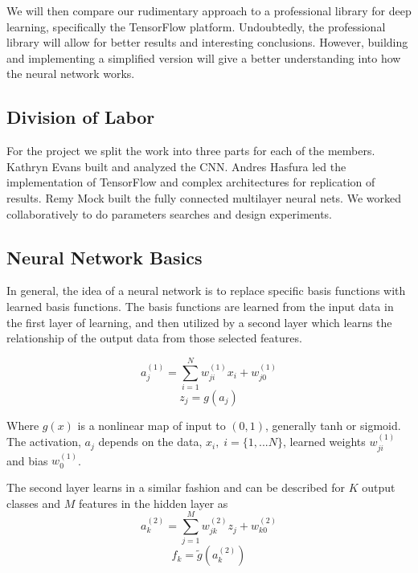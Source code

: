 \documentclass[12pt, twocolumn]{article}
\begin{document}
 We will then compare our rudimentary approach to a professional library for deep learning, specifically the TensorFlow platform. Undoubtedly, the professional library will allow for better results and interesting conclusions. However, building and implementing a simplified version will give a better understanding into how the neural network works. 

\subsection{Division of Labor}
	
 
 For the project we split the work into three parts for each of the members. Kathryn Evans built and analyzed the CNN. Andres Hasfura led the implementation of TensorFlow and complex architectures for replication of results. Remy Mock built the fully connected multilayer neural nets. We worked collaboratively to do parameters searches and design experiments. 

\subsection{Neural Network Basics}

In general, the idea of a neural network is to replace specific basis functions with learned basis functions. The basis functions are learned from the input data in the first layer of learning, and then utilized by a second layer which learns the relationship of the output data from those selected features.

\begin{equation}
a_j^{(1)}= \sum_{i=1}^N w_{ji}^{(1)} x_i+w_{j0}^{(1)}
\end{equation}
\begin{equation}
z_j= g(a_j)
\end{equation}

Where $g(x)$ is a nonlinear map of input to $(0,1)$, generally tanh or sigmoid. The activation, $a_j$  depends on the data, $x_i, \; i=\{1,...N\}$, learned weights $w_{ji}^{(1)}$ and bias $w_0^{(1)}$. 

The second layer learns in a similar fashion and can be described for $K$ output classes and $M$ features in the hidden layer as
\begin{equation}
a_k^{(2)}= \sum_{j=1}^M w_{jk}^{(2)} z_j+w_{k0}^{(2)}
\end{equation}
\begin{equation}
f_k= \tilde{g}(a_k^{(2)})
\end{equation}
 
\end{document}
